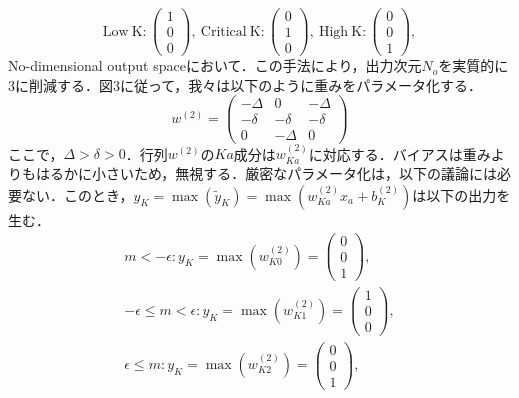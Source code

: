 \documentclass[a4paper,11pt]{jsarticle}
\begin{document}
\begin{equation}
  \text{Low} \ \text{K} :
  \begin{pmatrix}
    1 \\ 0 \\ 0
  \end{pmatrix}, \
  \text{Critical} \ \text{K} :
  \begin{pmatrix}
    0 \\ 1 \\ 0
  \end{pmatrix}, \
  \text{High} \ \text{K} :
  \begin{pmatrix}
    0 \\ 0 \\ 1
  \end{pmatrix},
\end{equation}
No-dimensional output spaceにおいて．この手法により，出力次元$N_o$を実質的に3に削減する．図3に従って，我々は以下のように重みをパラメータ化する．
\begin{equation}
  w^{(2)} =
  \begin{pmatrix}
    -\Delta & 0       & -\Delta \\
    -\delta & -\delta & -\delta \\
    0       & -\Delta & 0
  \end{pmatrix}
\end{equation}
ここで，$\Delta > \delta > 0$．行列$w^{(2)}$の$Ka$成分は$w_{Ka}^{(2)}$に対応する．バイアスは重みよりもはるかに小さいため，無視する．厳密なパラメータ化は，以下の議論には必要ない．このとき，$y_K = \max{(\tilde{y}_K)}=\max{(w_{Ka}^{(2)}x_a+b_K^{(2)})}$は以下の出力を生む．
\begin{align}
  m<-\epsilon : y_K = \max(w_{K0}^{(2)}) =
  \begin{pmatrix}
    0 \\ 0 \\ 1
  \end{pmatrix}, \\
  -\epsilon \leq m < \epsilon : y_K = \max(w_{K1}^{(2)}) =
  \begin{pmatrix}
    1 \\ 0 \\ 0
  \end{pmatrix}, \\
  \epsilon \leq m : y_K = \max(w_{K2}^{(2)}) =
  \begin{pmatrix}
    0 \\ 0 \\ 1
  \end{pmatrix},
\end{align}
\end{document}

